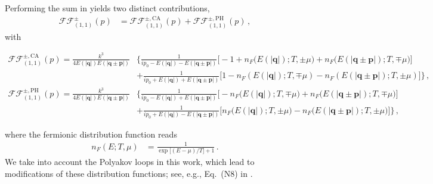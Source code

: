 \documentclass[reprint,english,superscriptaddress,preprintnumbers,amsmath,amssymb,aps,prd,nofootinbib]{revtex4-2}
\newcommand{\bs}[1]{\boldsymbol{#1}}
\begin{document}
Performing the sum in  yields two distinct contributions,
%
\begin{align}
  \mathcal{FF}^\pm_{(1,1)}(p)&= \mathcal{FF}_{(1,1)}^{\pm,\mathrm{CA}}(p)+\mathcal{FF}_{(1,1)}^{\pm,\mathrm{PH}}(p)\,,
\end{align}
%
with
\begin{widetext}
%
\begin{align}\label{eq:FFCA}
   \mathcal{FF}_{(1,1)}^{\pm,\mathrm{CA}}(p)=\frac{k^3}{4E(|\bs{q}|)E(|\bs{q}\pm\bs{p}|)}&\Bigg\{\frac{1}{i p_0-E(|\bs{q}|)-E(|\bs{q}\pm\bs{p}|)}\bigg[-1+n_F\big(E(|\bs{q}|);T,\pm\mu\big)+n_F\big(E(|\bs{q}\pm\bs{p}|);T,\mp\mu\big)\bigg]\nonumber\\[2ex]
    &+\frac{1}{i p_0+E(|\bs{q}|)+E(|\bs{q}\pm\bs{p}|)}\bigg[1-n_F(E(|\bs{q}|);T,\mp\mu)-n_F(E(|\bs{q}\pm\bs{p}|);T,\pm\mu)\bigg]\Bigg\}\,,
\end{align}
\begin{align}\label{eq:FFPH}
    \mathcal{FF}_{(1,1)}^{\pm,\mathrm{PH}}(p)=\frac{k^3}{4E(|\bs{q}|)E(|\bs{q}\pm\bs{p}|)}&\Bigg\{\frac{1}{i p_0-E(|\bs{q}|)+E(|\bs{q}\pm\bs{p}|)}\bigg[-n_F\big(E(|\bs{q}|);T,\mp\mu \big)+n_F\big(E(|\bs{q}\pm\bs{p}|);T,\mp\mu\big)\bigg]\nonumber\\[2ex]
    &+\frac{1}{i p_0+E(|\bs{q}|)-E(|\bs{q}\pm\bs{p}|)}\bigg[n_F\big(E(|\bs{q}|);T,\pm\mu\big)-n_F\big(E(|\bs{q}\pm\bs{p}|);T,\pm\mu\big)\bigg]\Bigg\}\,,
\end{align}
%
\end{widetext}
where the fermionic distribution function reads
%
\begin{align}
  n_F(E;T,\mu)&=\frac{1}{\exp\Big[(E-\mu)/T\Big]+1}\,.
\end{align} 
%
We take into account the Polyakov loops in this work, which lead to modifications of these distribution functions; see, e.g., Eq.\ (N8) in \cite{Fu:2019hdw}. 
\end{document}
